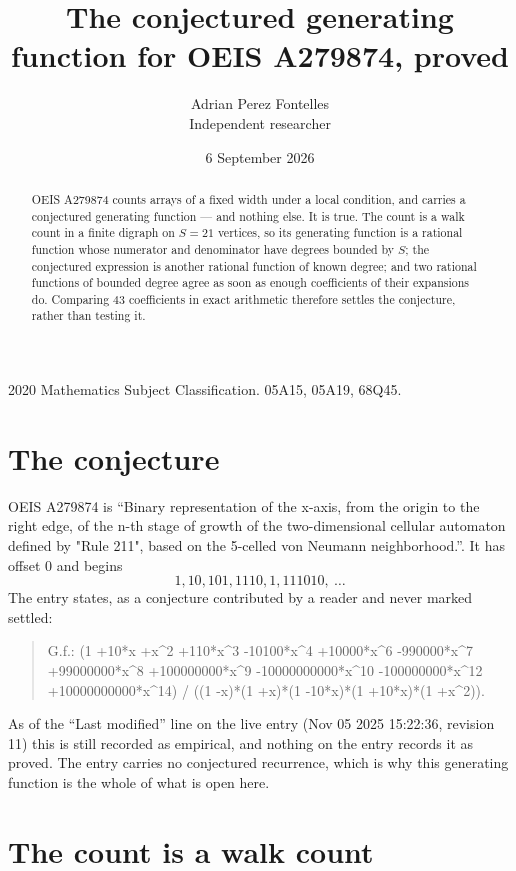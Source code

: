 \documentclass[11pt,a4paper]{article}
\title{The conjectured generating function for OEIS A279874, proved}
\author{Adrian Perez Fontelles\\ \small Independent researcher}
\date{6 September 2026}
\theoremstyle{plain}
\theoremstyle{definition}
\begin{document}
\maketitle

\begin{abstract}
OEIS A279874 counts arrays of a fixed width under a local condition, and carries a conjectured
generating function --- and nothing else. It is true. The count is a walk count in a finite
digraph on $S=21$ vertices, so its generating function is a rational function whose numerator
and denominator have degrees bounded by $S$; the conjectured expression is another rational
function of known degree; and two rational functions of bounded degree agree as soon as enough
coefficients of their expansions do. Comparing $43$ coefficients in exact arithmetic
therefore settles the conjecture, rather than testing it.
\end{abstract}

\noindent\small 2020 Mathematics Subject Classification. 05A15, 05A19, 68Q45.\normalsize

\section{The conjecture}

OEIS A279874 is ``Binary representation of the x-axis, from the origin to the right edge, of the n-th stage of growth of the two-dimensional cellular automaton defined by "Rule 211", based on the 5-celled von Neumann neighborhood.''. It has offset $0$ and begins
\[
1, 10, 101, 1110, 1, 111010,\ \dots
\]
The entry states, as a conjecture contributed by a reader and never marked settled:
\begin{quote}
G.f.: (1 +10*x +x\^{}2 +110*x\^{}3 -10100*x\^{}4 +10000*x\^{}6 -990000*x\^{}7 +99000000*x\^{}8 +100000000*x\^{}9 -10000000000*x\^{}10 -100000000*x\^{}12 +10000000000*x\^{}14) / ((1 -x)*(1 +x)*(1 -10*x)*(1 +10*x)*(1 +x\^{}2)).
\end{quote}
As of the ``Last modified'' line on the live entry (Nov 05 2025 15:22:36, revision 11) this is still
recorded as empirical, and nothing on the entry records it as proved. The entry carries no
conjectured recurrence, which is why this generating function is the whole of what is open
here.

\section{The count is a walk count}
\end{document}
